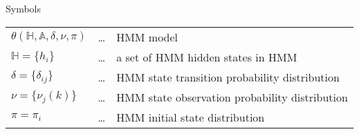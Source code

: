 \begin{preliminary}{Symbols}
\begin{supertabular}{lcl}
$\theta(\mathbb{H}, \mathbb{A}, \delta, \nu, \pi)$	& \dots & HMM model\\
$\mathbb{H}=\{h_i\}$			& \dots & a set of HMM hidden states in HMM\\
$\delta = \{\delta_{ij}\}$		& \dots & HMM state transition probability distribution\\
$\nu = \{\nu_{j}(k)\}$			& \dots & HMM state observation probability distribution\\
$\pi={\pi_i}$					& \dots & HMM initial state distribution\\


\end{supertabular}

\end{preliminary} 
